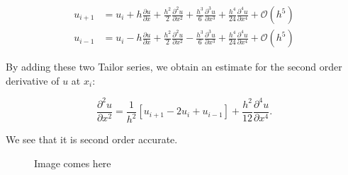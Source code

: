\documentclass[a4paper]{article}
\newcommand{\dux}{\frac{\partial u}{\partial x}}
\newcommand{\duxx}{\frac{\partial^2 u}{\partial x^2}}
\newcommand{\duxxx}{\frac{\partial^3 u}{\partial x^3}}
\begin{document}
\begin{align}
  u_{i + 1} & = u_i + h \dux + \frac{h^2}{2} \duxx + \frac{h^3}{6} \duxxx
                + \frac{h^4}{24} \frac{\partial^4 u}{\partial x^4} + \mathcal{O}(h^5) \\
%
  u_{i - 1} & = u_i - h \dux + \frac{h^2}{2} \duxx - \frac{h^3}{6} \duxxx
                + \frac{h^4}{24} \frac{\partial^4 u}{\partial x^4} + \mathcal{O}(h^5)
\end{align}

By adding these two Tailor series, we obtain an estimate for the second order derivative of
$u$ at $x_i$:

\begin{equation}
  \duxx = \frac{1}{h^2}[ u_{i + 1} - 2 u_i + u_{i - 1} ]
          + \frac{h^2}{12} \frac{\partial^4 u}{\partial x^4}.
\end{equation}

We see that it is second order accurate.

\begin{figure}
  \label{fig:1dcase}
  \caption{Image comes here}
\end{figure}
\end{document}
